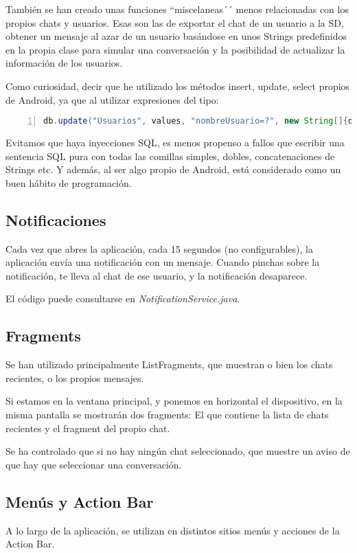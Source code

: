 \documentclass{article}
\begin{document}
Tambi\'{e}n se han creado unas funciones ``miscelaneas´´ menos relacionadas con los propios
chats y usuarios. Esas son las de exportar el chat de un usuario a la SD, obtener un mensaje
al azar de un usuario bas\'{a}ndose en unos Strings predefinidos en la propia clase para 
simular una conversaci\'{o}n y la posibilidad de actualizar la informaci\'{o}n de los 
usuarios.

Como curiosidad, decir que he utilizado los m\'etodos insert, update, select propios de
Android, ya que al utilizar expresiones del tipo: 


\begin{lstlisting}[language=java, numbers=left]
db.update("Usuarios", values, "nombreUsuario=?", new String[]{detallesDe});
\end{lstlisting}

Evitamos que haya inyecciones SQL, es menos propenso a fallos que escribir una sentencia
SQL pura con todas las comillas simples, dobles, concatenaciones de Strings etc. Y adem\'as,
al ser algo propio de Android, est\'a considerado como un buen h\'abito de programaci\'on.

\subsection{Notificaciones}
Cada vez que abres la aplicaci\'on, cada 15 segundos (no configurables), la aplicaci\'on
env\'ia una notificaci\'on con un mensaje. Cuando pinchas sobre la notificaci\'on, te
lleva al chat de ese usuario, y la notificaci\'on desaparece.

El c\'odigo puede consultarse en \emph{NotificationService.java}.

\subsection{Fragments}
Se han utilizado principalmente ListFragments, que muestran o bien los chats recientes, o 
los propios mensajes.

Si estamos en la ventana principal, y ponemos en horizontal el dispositivo, en la misma
pantalla se mostrar\'an dos fragments: El que contiene la lista de chats recientes y el
fragment del propio chat.

Se ha controlado que si no hay ning\'un chat seleccionado, que muestre un aviso de que hay
que seleccionar una conversaci\'on. 

\subsection{Men\'{u}s y Action Bar}
A lo largo de la aplicaci\'on, se utilizan en distintos sitios men\'us y acciones de la
Action Bar.
\end{document}
